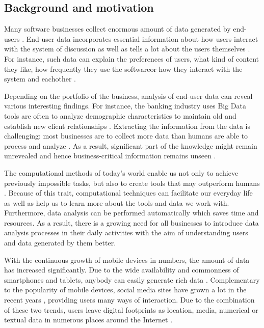 \subsection{Background and motivation}
    Many software businesses collect enormous amount of data generated by end-users \cite{chinesemobilebankingusers, bigdatamanagementrevolution, inmon2007tapping}. End-user data incorporates essential information about how users interact with the system of discussion as well as tells a lot about the users themselves \cite{jang2015noreciprocity, hu2014we, jang2016teensengagemorewithfewerphotos, han2016teensarefrommars, socialdiversityongithub}. For instance, such data can explain the preferences of users, what kind of content they like, how frequently they use the softwareor how they interact with the system and eachother \cite{youyou2015computer, ottoni2013ladies}.

    Depending on the portfolio of the business, analysis of end-user data can reveal various interesting findings. For instance, the banking industry uses Big Data tools are often to analyze demographic characteristics to maintain old and establish new client relationships \cite{chinesemobilebankingusers, bigdatamanagementrevolution}. Extracting the information from the data is challenging: most businesses are to collect more data than humans are able to process and analyze \cite{inmon2007tapping, wegener2010integrating}. As a result, significant part of the knowledge might remain unrevealed and hence business-critical information remains unseen \cite{chinesemobilebankingusers, inmon2007tapping, wegener2010integrating, introtodatamining}. 
    
    The computational methods of today's world enable us not only to achieve previously impossible tasks, but also to create tools that may outperform humans \cite{youyou2015computer}. Because of this trait, computational techniques can facilitate our everyday life as well as help us to learn more about the tools and data we work with. Furthermore, data analysis can be performed automatically which saves time and resources. As a result, there is a growing need for all businesses to introduce data analysis processes in their daily activities with the aim of understanding users and data generated by them better.

    With the continuous growth of mobile devices in numbers, the amount of data has increased significantly. Due to the wide availability and commonness of smartphones and tablets, anybody can easily generate rich data \cite{jang2016teensengagemorewithfewerphotos}. Complementary to the popularity of mobile devices, social media sites have grown a lot in the recent years \cite{hu2014we, ottoni2013ladies, bakhshi2014faces}, providing users many ways of interaction. Due to the combination of these two trends, users leave digital footprints as location, media, numerical or textual data in numerous places around the Internet \cite{youyou2015computer}. 
    
